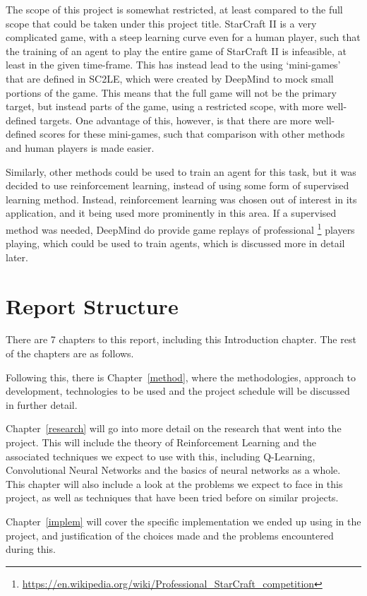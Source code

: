 The scope of this project is somewhat restricted, at least compared to the full
scope that could be taken under this project title. StarCraft II is a very
complicated game, with a steep learning curve even for a human player, such that
the training of an agent to play the entire game of StarCraft II is infeasible,
at least in the given time-frame. This has instead lead to the using
`mini-games' that are defined in SC2LE, which were created by DeepMind to mock
small portions of the game. This means that the full game will not be the
primary target, but instead parts of the game, using a restricted scope, with
more well-defined targets.  One advantage of this, however, is that there are
more well-defined scores for these mini-games, such that comparison with other
methods and human players is made easier.

Similarly, other methods could be used to train an agent for this task, but it
was decided to use reinforcement learning, instead of using some form of
supervised learning method. Instead, reinforcement learning was chosen out of
interest in its application, and it being used more prominently in this area.
If a supervised method was needed, DeepMind do provide game replays of
professional%
\footnote{\url{https://en.wikipedia.org/wiki/Professional_StarCraft_competition}}
players playing, which could be used to train agents, which is discussed more in
detail later.

\section{Report Structure}

There are 7 chapters to this report, including this Introduction chapter.
The rest of the chapters are as follows.

Following this, there is Chapter~\ref{method}, where the methodologies,
approach to development, technologies to be used and the project
schedule will be discussed in further detail.

Chapter~\ref{research} will go into more detail on the research that went into
the project. This will include the theory of Reinforcement Learning and the
associated techniques we expect to use with this, including Q-Learning,
Convolutional Neural Networks and the basics of neural networks as a
whole. This chapter will also include a look at the problems we
expect to face in this project, as well as techniques that have been tried
before on similar projects.

Chapter~\ref{implem} will cover the specific implementation we ended up using
in the project, and justification of the choices made and the problems
encountered during this.

